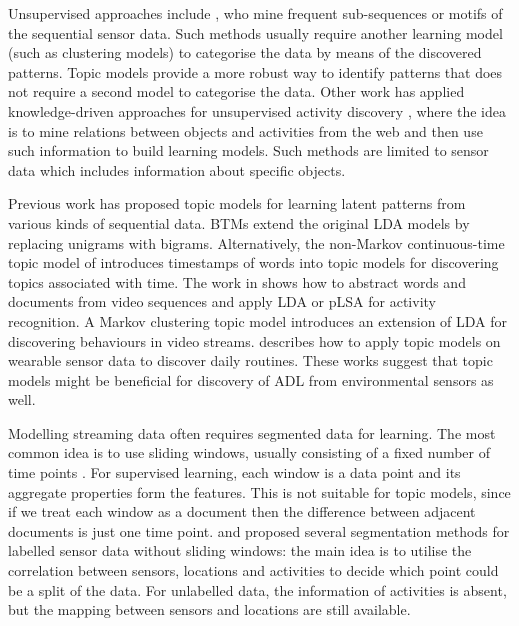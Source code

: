 \documentclass{article}
\begin{document}
Unsupervised approaches include \cite{saives2015activity,vahdatpour2009toward}, who mine frequent sub-sequences or motifs of the sequential sensor data. 
Such methods usually require another learning model (such as clustering models) to categorise the data by means of the discovered patterns. Topic models provide a more robust way to identify patterns that does not require a second model to categorise the data.
% 
Other work has applied knowledge-driven approaches for unsupervised activity discovery \cite{wyatt2005unsupervised,gu2010unsupervised}, where the idea is to mine relations between objects and activities from the web and then use such information to build learning models. 
Such methods are limited to sensor data which includes information about specific objects. 

Previous work has proposed topic models for learning latent patterns from various kinds of sequential data. \acp{BTM} \cite{wallach2006topic} extend the original \ac{LDA} models \cite{blei2003latent} by replacing unigrams with bigrams. Alternatively, the non-Markov continuous-time topic model of \cite{wang2006topics} introduces timestamps of words into topic models for discovering topics associated with time. The work in \cite{niebles2008unsupervised} shows how to abstract words and documents from video sequences and apply \ac{LDA} or \ac{pLSA} \cite{hofmann1999probabilistic} for activity recognition. A Markov clustering topic model \cite{hospedales2009markov} introduces an extension of \ac{LDA} for discovering behaviours in video streams. \cite{huynh2008discovery} describes how to apply topic models on wearable sensor data to discover daily routines. These works suggest that topic models might be beneficial for discovery of \ac{ADL} from environmental sensors as well. 

Modelling streaming data often requires segmented data for learning. The most common idea is to use sliding windows, usually consisting of a fixed number of time points \cite{krishnan2014activity}. For supervised learning, each window is a data point and its aggregate properties form the features. This is not suitable for topic models, since if we treat each window as a document then the difference between adjacent documents is just one time point. \cite{hong2013segmenting} and \cite{wan2015dynamic} proposed several segmentation methods for labelled sensor data without sliding windows: the main idea is to utilise the correlation between sensors, locations and activities to decide which point could be a split of the data. For unlabelled data, the information of activities is absent, but the mapping between sensors and locations are still available.
\end{document}
